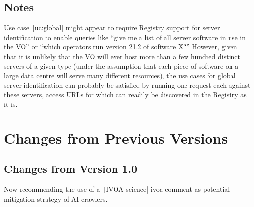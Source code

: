 \documentclass[11pt,a4paper]{ivoa}
\begin{document}
\subsection{Notes}

Use case~\ref{uc:global} might appear to require Registry support for
server identification to enable queries like ``give me a list of all
server software in use in the VO'' or ``which operators run version 21.2
of software X?''  However, given that it is unlikely that the VO will
ever host more than a few hundred distinct servers of a given type
(under the assumption that each piece of software on a large data centre
will serve many different resources), the use cases for global server
identification can probably be satisfied by running one request each
against these servers, access URLs for which can readily be discovered
in the Registry as it is.

\appendix
\section{Changes from Previous Versions}

\subsection{Changes from Version 1.0}

Now recommending the use of a \texttt|IVOA-science| ivoa-comment as
potential mitigation strategy of AI crawlers.




\end{document}
